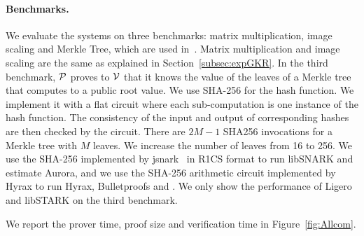 \paragraph{Benchmarks.} We evaluate the systems on three benchmarks: matrix multiplication, image scaling and Merkle Tree\cite{merkletree}, which are used in~\cite{hyrax}. Matrix multiplication and image scaling are the same as explained in Section~\ref{subsec:expGKR}. In the third benchmark, $\P$ proves to $\V$ that it knows the value of the leaves of a Merkle tree\cite{merkletree} that computes to a public root value\cite{blum1994checking}. We use SHA-256 for the hash function. We implement it with a flat circuit where each sub-computation is one instance of the hash function. The consistency of the input and output of corresponding hashes are then checked by the circuit. There are $2M - 1$ SHA256 invocations for a Merkle tree with $M$ leaves. We increase the number of leaves from 16 to 256. We use the SHA-256 implemented by jsnark~\cite{jsnark} in R1CS format to run \textsf{libSNARK} and estimate \textsf{Aurora}, and we use the SHA-256 arithmetic circuit implemented by \textsf{Hyrax} to run \textsf{Hyrax}, \textsf{Bulletproofs} and \name. We only show the performance of \textsf{Ligero} and \textsf{libSTARK} on the third benchmark.

We report the prover time, proof size and verification time in Figure~\ref{fig:Allcom}.



